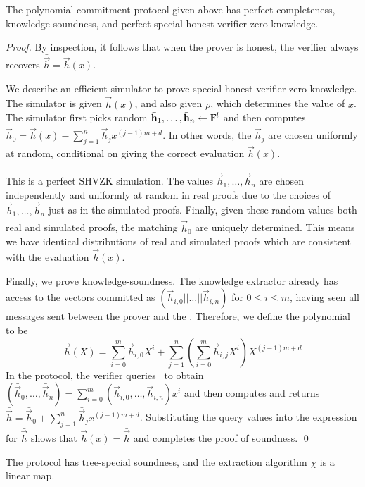 \begin{lemma} \label{proofpolycommit}
The polynomial commitment protocol given above has perfect completeness, knowledge-soundness, and perfect special honest verifier zero-knowledge.
\end{lemma}
\begin{proof}
By inspection, it follows that when the prover is honest, the verifier always recovers $\bar{\vec{h}}=\vec{h}(x)$. 

We describe an efficient simulator to prove special honest verifier zero knowledge. The simulator is given $\vec{h}(x)$, and also given $\rho$, which determines the value of $x$. The simulator first picks random $\bar{\mathbf{h}}_1,\ldots,\bar{\mathbf{h}}_n\gets \mathbb{F}^l$ and then computes $\bar{\vec{h}}_0=\vec{h}(x)-\sum_{j=1}^n\bar{\vec{h}}_jx^{(j-1)m+d}$. In other words, the $\vec{h}_j$ are chosen uniformly at random, conditional on giving the correct evaluation $\vec{h}(x)$.

This is a perfect SHVZK simulation. The values $\bar{\vec{h}}_1,\ldots,\bar{\vec{h}}_n$ are chosen independently and uniformly at random in real proofs due to the choices of $\vec{b}_1,\ldots,\vec{b}_n$ just as in the simulated proofs. Finally, given these random values both real and simulated proofs, the matching $\bar{\vec{h}}_0$ are uniquely determined. This means we have identical distributions of real and simulated proofs which are consistent with the evaluation $\vec{h}(x)$.

Finally, we prove knowledge-soundness. The knowledge extractor already has access to the vectors committed as $(\vec{h}_{i,0}||\ldots||\vec{h}_{i,n})$ for $0 \leq i \leq m$, having seen all messages sent between the prover and the \ILC. Therefore, we define the polynomial to be $$\vec{h}(X)=\sum_{i=0}^m\vec{h}_{i,0}X^i +\sum_{j=1}^{n} \left(\sum_{i=0}^m\vec{h}_{i,j}X^i \right)X^{(j-1)m+d}$$
In the protocol, the verifier queries \ILC\ to obtain $(\bar{\vec{h}}_0,\ldots,\bar{\vec{h}}_n) = \sum_{i=0}^{m} (\vec{h}_{i,0},\ldots,\vec{h}_{i,n}) x^i$ and then computes and returns $\bar{\vec{h}} = \bar{\vec{h}}_0+\sum_{j=1}^{n} \bar{\vec{h}}_{j} x^{(j-1)m+d}$. Substituting the query values into the expression for $\bar{\vec{h}}$ shows that $\vec{h}(x) = \bar{\vec{h}}$ and completes the proof of soundness. \qed
\end{proof}

\begin{lemma}
The protocol has tree-special soundness, and the extraction algorithm $\chi$ is a linear map.
\end{lemma}

